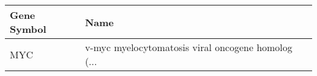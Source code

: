 \begin{tabular}{ll}
\toprule
Gene Symbol &                                               Name \\
\midrule
        MYC & v-myc myelocytomatosis viral oncogene homolog (... \\
\bottomrule
\end{tabular}
